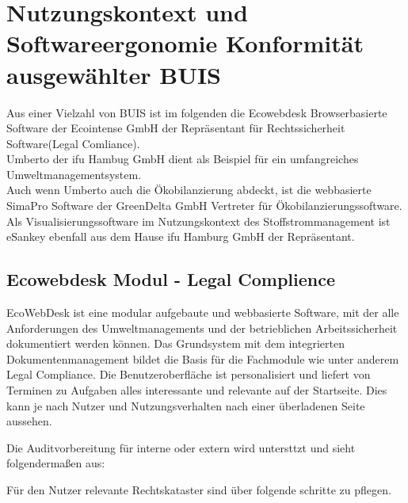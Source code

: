 \documentclass[a4paper, 12pt, twoside, BCOR=20mm, DIV=calc, abstracton, parskip=half*, toc=bibliography, toc=listof, headsepline, footsepline, headings=small, numbers=enddot]{scrreprt}
\begin{document}
\section{Nutzungskontext und Softwareergonomie Konformität ausgewählter BUIS}
Aus einer Vielzahl von \ac{BUIS} ist im folgenden die Ecowebdesk Browserbasierte Software der Ecointense GmbH der Repräsentant für Rechtssicherheit Software(Legal Comliance). \\
Umberto der ifu Hambug GmbH dient als Beispiel für ein umfangreiches Umweltmanagementsystem.\\
Auch wenn Umberto auch die Ökobilanzierung abdeckt, ist die webbasierte SimaPro Software der GreenDelta GmbH Vertreter für Ökobilanzierungssoftware. \\
Als Visualisierungssoftware im Nutzungskontext des Stoffstrommanagement ist eSankey ebenfall aus dem Hause ifu Hamburg GmbH der Repräsentant. 
\subsection{Ecowebdesk Modul - Legal Complience}

EcoWebDesk ist eine modular aufgebaute und webbasierte Software, mit der alle Anforderungen des Umweltmanagements und der betrieblichen Arbeitssicherheit dokumentiert werden können.
Das Grundsystem mit dem integrierten Dokumentenmanagement bildet die Basis für die Fachmodule wie unter anderem Legal Compliance. Die Benutzeroberfläche ist personalisiert und liefert von Terminen zu Aufgaben alles interessante und relevante auf der Startseite. Dies kann je nach Nutzer und Nutzungsverhalten nach einer überladenen Seite aussehen. 

Die Auditvorbereitung für interne oder extern wird untersttzt und sieht folgendermaßen aus:

Für den Nutzer relevante Rechtskataster sind über folgende schritte zu pflegen. 

\end{document}
